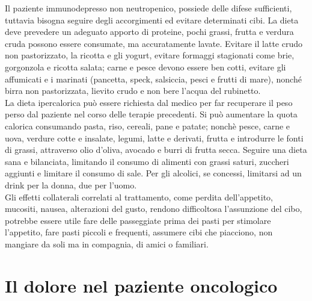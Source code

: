 Il paziente immunodepresso non neutropenico, possiede delle difese sufficienti, tuttavia bisogna seguire degli 
accorgimenti ed evitare determinati cibi\cite{DIETA}. La dieta deve prevedere 
un adeguato apporto di proteine, pochi grassi, frutta e verdura cruda possono essere consumate, ma accuratamente 
lavate. Evitare il latte crudo non pastorizzato, la ricotta e gli yogurt, evitare formaggi stagionati come 
brie, gorgonzola e ricotta salata; carne e pesce devono essere ben cotti, evitare gli affumicati e i 
marinati (pancetta, speck, salsiccia, pesci e frutti di mare), nonché birra non pastorizzata, lievito crudo e
non bere l’acqua del rubinetto\cite{DIETA}.\\
La dieta ipercalorica può essere richiesta dal medico per far recuperare il peso perso dal paziente nel corso delle 
terapie precedenti. Si può aumentare la quota calorica consumando pasta, riso, cereali, pane e patate; 
nonchè pesce, carne e uova, verdure cotte e insalate, legumi, latte e derivati, frutta e introdurre le fonti di grassi, 
attraverso olio d’oliva, avocado e burri di frutta secca\cite{DIETA}. 
Seguire una dieta sana e bilanciata, limitando il consumo di alimenti con grassi 
saturi, zuccheri aggiunti e limitare il consumo di sale. Per gli alcolici, se concessi, 
limitarsi ad un drink per la donna, due per l’uomo\cite{LLSNUTRITION}.\\
Gli effetti collaterali correlati al trattamento, come perdita dell’appetito, mucositi, nausea, alterazioni del 
gusto, rendono difficoltosa l’assunzione del cibo, potrebbe essere utile fare delle passeggiate prima dei pasti per 
stimolare l’appetito, fare pasti piccoli e frequenti, assumere cibi che piacciono, non mangiare da soli ma in compagnia, di 
amici o familiari\cite{LLSNUTRITION}.

\section{Il dolore nel paziente oncologico}

